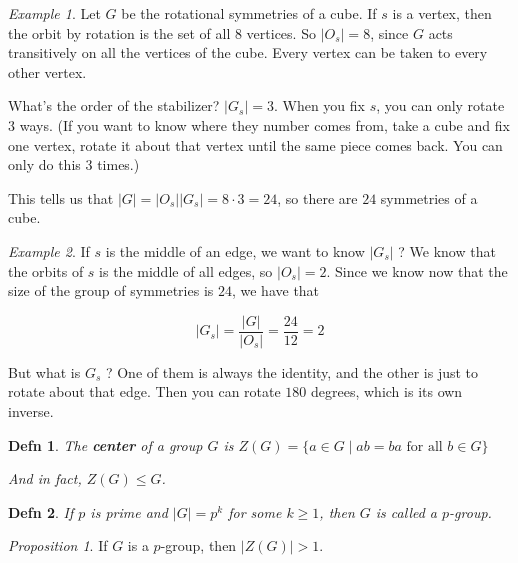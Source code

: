 \documentclass[12pt]{article}
\newtheorem{definition}{Defn}
\theoremstyle{remark}
\newtheorem{proposition}{Proposition}
\theoremstyle{remark}
\theoremstyle{remark}
\newtheorem{example}{Example}
\theoremstyle{remark}
\theoremstyle{remark}
\begin{document}
\begin{example}
  Let $G$ be the rotational symmetries of a cube. If $s$ is a vertex, then the
  orbit by rotation is the set of all 8 vertices. So $|O_s| = 8$, since $G$ acts
  transitively on all the vertices of the cube. Every vertex can be taken to
  every other vertex.

  What's the order of the stabilizer? $|G_s| = 3$. When you fix $s$, you can
  only rotate 3 ways. (If you want to know where they number comes from, take a
  cube and fix one vertex, rotate it about that vertex until the same piece
  comes back. You can only do this 3 times.)

  This tells us that $|G| = |O_s| |G_s| = 8 \cdot 3 = 24$, so there are $24$
  symmetries of a cube.
\end{example}

\begin{example}
  If $s$ is the middle of an edge, we want to know $|G_s|$ ? We know that the
  orbits of $s$ is the middle of all edges, so $|O_s| = 2$. Since we know now
  that the size of the group of symmetries is $24$, we have that

  \[
    |G_s| = \frac{|G|}{|O_s|} = \frac{24}{12} = 2
  \]

  But what is $G_s$ ? One of them is always the identity, and the other is just
  to rotate about that edge. Then you can rotate $180$ degrees, which is its own
  inverse.
\end{example}

\begin{definition}
  The {\bf center} of a group $G$ is $Z(G) = \{a \in G \mid ab = ba \text{ for
  all } b \in G \}$

  And in fact, $Z(G) \le G$.
\end{definition}

\begin{definition}
  If $p$ is prime and $|G| = p^k$ for some $k \ge 1$, then $G$ is called a
  $p$-group.
\end{definition}

\begin{proposition}
  If $G$ is a $p$-group, then $|Z(G)| > 1$.
\end{proposition}
\end{document}
